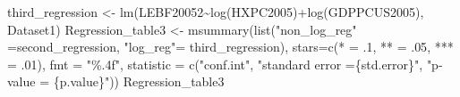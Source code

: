 \documentclass[
]{article}
\newenvironment{Shaded}{\begin{snugshade}}{\end{snugshade}}
\newcommand{\AttributeTok}[1]{\textcolor[rgb]{0.77,0.63,0.00}{#1}}
\newcommand{\DecValTok}[1]{\textcolor[rgb]{0.00,0.00,0.81}{#1}}
\newcommand{\FunctionTok}[1]{\textcolor[rgb]{0.00,0.00,0.00}{#1}}
\newcommand{\NormalTok}[1]{#1}
\newcommand{\OtherTok}[1]{\textcolor[rgb]{0.56,0.35,0.01}{#1}}
\newcommand{\SpecialCharTok}[1]{\textcolor[rgb]{0.00,0.00,0.00}{#1}}
\newcommand{\StringTok}[1]{\textcolor[rgb]{0.31,0.60,0.02}{#1}}
\begin{document}
\begin{Shaded}
\begin{Highlighting}[]
\NormalTok{third\_regression }\OtherTok{\textless{}{-}} \FunctionTok{lm}\NormalTok{(LEBF20052}\SpecialCharTok{\textasciitilde{}}\FunctionTok{log}\NormalTok{(HXPC2005)}\SpecialCharTok{+}\FunctionTok{log}\NormalTok{(GDPPCUS2005), Dataset1)}
\NormalTok{Regression\_table3 }\OtherTok{\textless{}{-}} \FunctionTok{msummary}\NormalTok{(}\FunctionTok{list}\NormalTok{(}\StringTok{"non\_log\_reg"} \OtherTok{=}\NormalTok{second\_regression, }
                                   \StringTok{"log\_reg"}\OtherTok{=}\NormalTok{ third\_regression), }
                              \AttributeTok{stars=}\FunctionTok{c}\NormalTok{(}\StringTok{\textquotesingle{}*\textquotesingle{}} \OtherTok{=}\NormalTok{ .}\DecValTok{1}\NormalTok{, }\StringTok{\textquotesingle{}**\textquotesingle{}} \OtherTok{=}\NormalTok{ .}\DecValTok{05}\NormalTok{, }\StringTok{\textquotesingle{}***\textquotesingle{}} \OtherTok{=}\NormalTok{ .}\DecValTok{01}\NormalTok{),}
                              \AttributeTok{fmt =} \StringTok{"\%.4f"}\NormalTok{,  }\AttributeTok{statistic =} \FunctionTok{c}\NormalTok{(}\StringTok{"conf.int"}\NormalTok{,  }\StringTok{"standard error }
\StringTok{                                                           =\{std.error\}"}\NormalTok{, }
                                            \StringTok{"p{-}value = \{p.value\}"}\NormalTok{))}
\NormalTok{Regression\_table3}
\end{Highlighting}
\end{Shaded}
\end{document}

